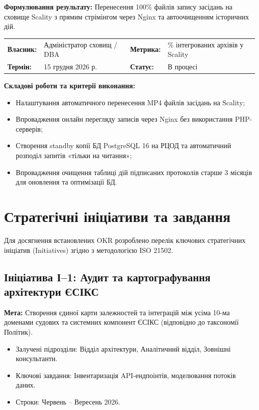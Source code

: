 \documentclass{article}
\begin{document}
\textbf{Формулювання результату:} Перенесення 100\% файлів запису засідань на сховище Scality з прямим стрімінгом через Nginx та автоочищенням історичних дій.

\noindent\begin{tabular}{@{}p{2.2cm}p{4.5cm}p{2.2cm}p{4.5cm}@{}}
\toprule
\textbf{Власник:} & Адміністратор сховищ / DBA & \textbf{Метрика:} & \% інтегрованих архівів у Scality \\
\textbf{Термін:} & 15 грудня 2026 р. & \textbf{Статус:} & В процесі \\
\bottomrule
\end{tabular}

\vspace{10pt}
\textbf{Складові роботи та критерії виконання:}
\begin{itemize}
    \item Налаштування автоматичного перенесення MP4 файлів засідань на Scality;
    \item Впровадження онлайн перегляду записів через Nginx без використання PHP-серверів;
    \item Створення standby копії БД PostgreSQL 16 на РЦОД та автоматичний розподіл запитів «тільки на читання»;
    \item Впровадження очищення таблиці дій підписаних протоколів старше 3 місяців для оновлення та оптимізації БД.
\end{itemize}

\newpage

\section{Стратегічні ініціативи та завдання}
Для досягнення встановлених OKR розроблено перелік ключових стратегічних ініціатив (Initiatives) згідно з методологією ISO 21502.

\subsection{Ініціатива І--1: Аудит та картографування архітектури ЄСІКС}
\textbf{Мета:} Створення єдиної карти залежностей та інтеграцій між усіма 10-ма доменами судових та системних компонент ЄСІКС (відповідно до таксономії Політик).
\begin{itemize}
    \item Залучені підрозділи: Відділ архітектури, Аналітичний відділ, Зовнішні консультанти.
    \item Ключові завдання: Інвентаризація API-ендпоінтів, моделювання потоків даних.
    \item Строки: Червень -- Вересень 2026.
\end{itemize}
\end{document}
